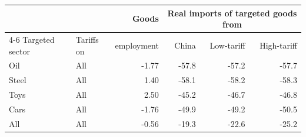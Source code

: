 \begin{tabular}{llrrrr}
\toprule
 & & Goods & \multicolumn{3}{c}{Real imports of targeted goods from} \\
\cmidrule(lr){4-6}
Targeted sector & Tariffs on & employment & China & Low-tariff & High-tariff \\
\midrule
Oil & All & -1.77 & -57.8 & -57.2 & -57.7 \\
\midrule
Steel & All & 1.40 & -58.1 & -58.2 & -58.3 \\
\midrule
Toys & All & 2.50 & -45.2 & -46.7 & -46.8 \\
\midrule
Cars & All & -1.76 & -49.9 & -49.2 & -50.5 \\
\midrule
All & All & -0.56 & -19.3 & -22.6 & -25.2 \\
\bottomrule
\end{tabular}
